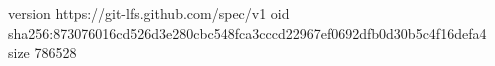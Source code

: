 version https://git-lfs.github.com/spec/v1
oid sha256:873076016cd526d3e280cbc548fca3cccd22967ef0692dfb0d30b5c4f16defa4
size 786528
